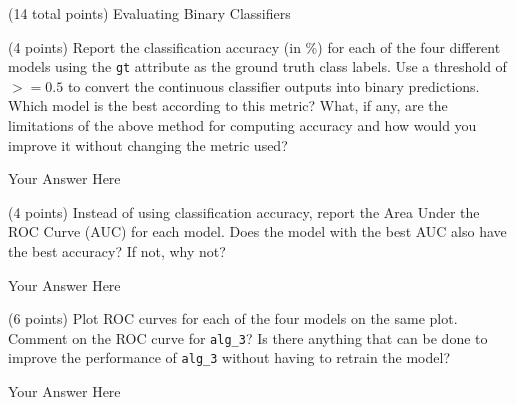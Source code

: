 \documentclass[12pt]{article}
\begin{document}
\begin{question}{(14 total points) Evaluating Binary Classifiers}





%
%
\begin{subquestion}{(4 points) Report the classification accuracy (in \%) for each of the four different models using the \texttt{gt} attribute as the ground truth class labels. 
Use a threshold of $>= 0.5$ to convert the continuous classifier outputs into binary predictions. 
Which model is the best according to this metric?
What, if any, are the limitations of the above method for computing accuracy and how would you improve it without changing the metric used?
}


\begin{answerbox}{15em}
Your Answer Here
\end{answerbox}



\end{subquestion}



%
%
\begin{subquestion}{(4 points) Instead of using classification accuracy, report the Area Under the ROC Curve (AUC) for each model. 
Does the model with the best AUC also have the best accuracy? If not, why not?\\
}


\begin{answerbox}{15em}
Your Answer Here
\end{answerbox}



\end{subquestion}



%
%
\begin{subquestion}{(6 points) Plot ROC curves for each of the four models on the same plot.
Comment on the ROC curve for \texttt{alg\_3}?
Is there anything that can be done to improve the performance of \texttt{alg\_3} without having to retrain the model?\\
}


\begin{answerbox}{35em}
Your Answer Here
\end{answerbox}



\end{subquestion}

\end{question}
\end{document}
